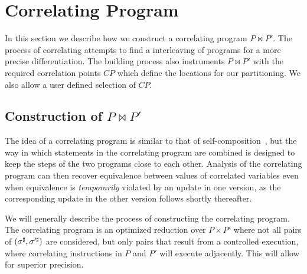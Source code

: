 \section{Correlating Program} 

In this section we describe how we construct a correlating program $P \bowtie P'$. The process of correlating attempts to find a interleaving of programs for a more precise differentiation. The building process also instruments $P \bowtie P'$ with the required correlation points $CP$ which define the locations for our partitioning. We also allow a user defined selection of $CP$.

\subsection{Construction of $P \bowtie P'$ }
The idea of a correlating program is similar to that of
self-composition~\cite{AikenTerauchi05}, but the way in
which statements in the correlating program are combined is designed to
keep the steps of the two programs close to each other. Analysis of the correlating program can then recover equivalence between values of correlated variables even when
equivalence is \emph{temporarily} violated by an update in one version, as
the corresponding update in the other version follows shortly thereafter.

We will generally describe the process of constructing the correlating program. The correlating program is an optimized reduction over $P \times P'$ where not all pairs of $(\sigma^\sharp,\sigma'^\sharp)$ are considered, but only pairs that result from a controlled execution, where correlating instructions in $P$ and $P'$ will execute adjacently. This will allow for superior precision.

